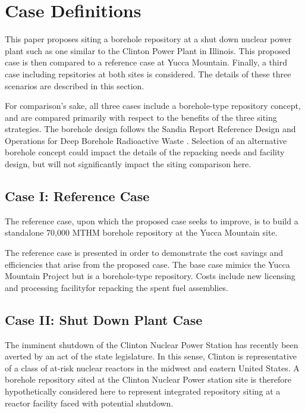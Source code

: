 
\section{Case Definitions}

This paper proposes siting a borehole
 repository at a shut down nuclear power plant such as one similar to the 
 Clinton Power Plant in Illinois. This proposed case is then compared to a 
 reference case at Yucca Mountain. Finally, a third case including repsitories 
 at both sites is considered.  The details of these three scenarios are described in this section.

 For comparison's sake, all three cases include a borehole-type repository concept, and are compared 
 primarily with respect to the benefits of the three siting strategies.
The borehole design follows the Sandia Report Reference Design and Operations 
for Deep Borehole Radioactive Waste \cite{arnold_reference_2011}. Selection of 
an alternative borehole concept could impact the details of the repacking needs 
and facility design, but will not significantly impact the siting comparison 
here.
 
\subsection{Case I: Reference Case} 
The reference case, upon which the proposed case seeks to improve, is to build 
a standalone 70,000 \gls{MTHM} borehole repository at the Yucca Mountain site.

The reference case is presented in order to demonstrate the cost savings and efficiencies 
that arise from the proposed case. The base case mimics the Yucca Mountain Project
but is a borehole-type repository. Costs include new licensing and processing facilityfor repacking the spent fuel assemblies.

\subsection{Case II: Shut Down Plant Case}

The imminent shutdown of the Clinton Nuclear Power Station has recently been 
averted by an act of the state legislature. In this sense, Clinton is 
representative of a class of at-risk nuclear 
reactors in the midwest and eastern United States. A borehole repository 
sited at the Clinton Nuclear Power station site is therefore hypothetically 
considered here to represent integrated repository siting at a reactor facility 
faced with potential shutdown.

